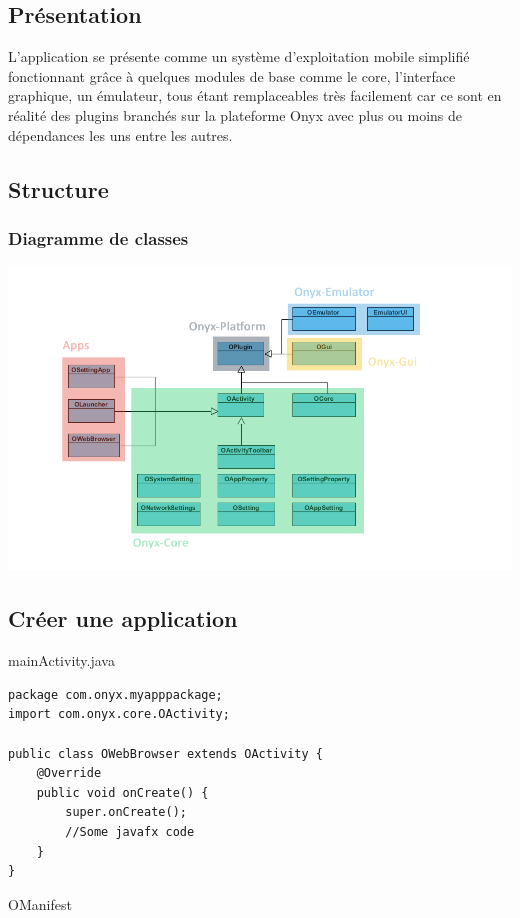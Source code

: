 \subsection{Présentation}
L'application se présente comme un système d'exploitation mobile simplifié fonctionnant grâce à quelques modules de base comme le core, l'interface graphique, un émulateur, tous étant remplaceables très facilement car ce sont en réalité des plugins branchés sur la plateforme Onyx avec plus ou moins de dépendances les uns entre les autres.

\subsection{Structure}

\subsubsection{Diagramme de classes}
\includegraphics[width=20cm]{figures/class_diagram_app.png}

\subsection{Créer une application}

mainActivity.java

\begin{verbatim}
package com.onyx.myapppackage;
import com.onyx.core.OActivity;

public class OWebBrowser extends OActivity {
    @Override
    public void onCreate() {
        super.onCreate();
        //Some javafx code
    }
}
\end{verbatim}

OManifest


